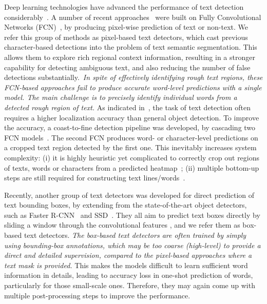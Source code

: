 \documentclass[10pt,twocolumn,letterpaper]{article}
\begin{document}
Deep learning technologies have advanced the performance of text detection considerably~\cite{Tian2016, Gupta2016, Zhang2016, Zhu2016, He2016b, Pan2016_reading}. A number of recent approaches~\cite{Zhang2016,Gupta2016, He2016b, Yao2016} were built on Fully Convolutional Networks (FCN)~\cite{Long2015}, by producing pixel-wise prediction of text or non-text. We refer this group of methods as pixel-based text detectors, which cast previous character-based detections into the problem of text semantic segmentation. This allows them to explore rich regional context information, resulting in a stronger capability for detecting ambiguous text, and also reducing the number of false detections substantially.~\textit{In spite of effectively identifying rough text regions, these FCN-based approaches fail to produce accurate word-level predictions with a single model. The main challenge is to precisely identify individual words from a detected rough region of text.} As indicated in~\cite{Tian2016}, the task of text detection often requires a higher localization accuracy than general object detection. To improve the accuracy, a coast-to-fine detection pipeline was developed, by cascading two FCN models~\cite{He2016b, Zhang2016}. The second FCN produces word- or character-level predictions on a cropped text region detected by the first one. This inevitably increases system complexity: (i) it is highly heuristic yet complicated to correctly crop out regions of texts, words or characters from a  predicted heatmap~\cite{He2016b, Zhang2016}; (ii) multiple bottom-up steps are still required for constructing text lines/words~\cite{Zhang2016, Yao2016}.

Recently, another group of text detectors was developed for direct prediction of text bounding boxes, by extending from the state-of-the-art object detectors, such as Faster R-CNN~\cite{Ren2015} and SSD~\cite{liu2016SSD}. They all aim to predict text boxes directly by sliding a window through the convolutional features \cite{Liu2017, Tian2016, Liao2017, Gupta2016,Zhou2017, Shi2017}, and we refer them as box-based text detectors. \textit{The box-based text detectors are often trained by simply using bounding-box annotations, which may be too coarse (high-level) to provide a direct and detailed supervision, compared to the pixel-based approaches where a text mask is provided.}  This makes the models difficult to learn sufficient word information in details, leading to accuracy loss in one-shot prediction of words, particularly for those small-scale ones. Therefore, they may again come up with multiple post-processing steps to improve the performance.
\end{document}
